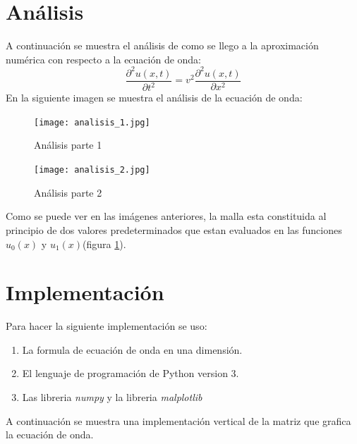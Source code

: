 \documentclass[a4paper,12pt]{article}
\newcommand{\eq}[1]{$#1$}
\begin{document}
    \section{Análisis}
    
    A continuación se muestra el análisis de como se llego a la aproximación numérica
    con respecto a la ecuación de onda:
    \begin{equation}
        \frac{\partial^2 u(x,t)}{\partial t^2} = v^2\frac{\partial^2 u(x,t)}{\partial x^2}
    \end{equation}
    \clearpage
    En la siguiente imagen se muestra el análisis de la ecuación de onda:
    \begin{figure}[h]
        \centering
        \texttt{[image: analisis\_1.jpg]}
        \caption{Análisis parte 1}
        \label{fig:ana1}
    \end{figure}
    \enlargethispage{\baselineskip}
    \clearpage
    \begin{figure}[t]
        \centering
        \texttt{[image: analisis\_2.jpg]}
        \label{fig:ana2}
        \caption{Análisis parte 2}
    \end{figure}

    Como se puede ver en las imágenes anteriores,
    la malla esta constituida al principio de dos valores predeterminados
    que estan evaluados en las funciones \eq{u_0(x)} y \eq{u_1(x)}(figura \ref{fig:ana1}).

    \section{Implementación}
    Para hacer la siguiente implementación se uso:
    \begin{enumerate}
        \item La formula de ecuación de onda en una dimensión.
        \item El lenguaje de programación de Python version 3.
        \item Las libreria \emph{numpy} y la libreria \emph{malplotlib}
    \end{enumerate}

    A continuación se muestra una implementación vertical 
    de la matriz que grafica la ecuación de onda.
    
    
\end{document}
